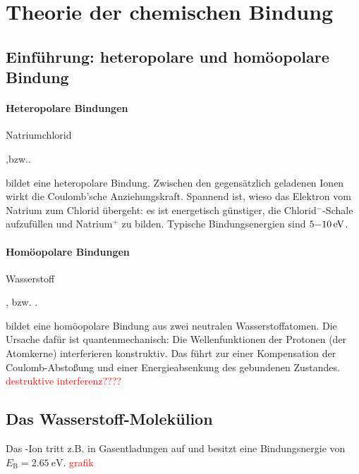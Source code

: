 \clearpage
\section{Theorie der chemischen Bindung}
\subsection{Einführung: heteropolare und homöopolare Bindung}
    \paragraph{Heteropolare Bindungen}
    Natriumchlorid
    \begin{center}
        ,\quad bzw.\quad {}.
    \end{center}
    bildet eine heteropolare Bindung.
    Zwischen den gegensätzlich geladenen Ionen wirkt die Coulomb'sche Anziehungskraft.     
    Spannend ist, wieso das Elektron vom Natrium zum Chlorid übergeht: 
    es ist energetisch günstiger, die Chlorid${}^-$-Schale aufzufüllen und Natrium${}^+$ zu bilden. 
    Typische Bindungsenergien sind $\SI[parse-numbers=false]{5\text-10}{\electronvolt}$.

    \paragraph{Homöopolare Bindungen}
    Wasserstoff
    \begin{center}
        , \quad bzw. \quad{}.
    \end{center}
    bildet eine homöopolare Bindung aus zwei neutralen Wasserstoffatomen.
    Die Ursache dafür ist quantenmechanisch: 
    Die Wellenfunktionen der Protonen (der Atomkerne) interferieren konstruktiv.
    Das führt zur einer Kompensation der Coulomb-Abstoßung und einer Energieabsenkung des gebundenen Zustandes.
    \textcolor{red}{destruktive interferenz????}

\subsection{Das Wasserstoff-Molekülion }
    Das -Ion tritt z.B. in Gasentladungen auf und besitzt eine Bindungsnergie von $E_\text{B}= \SI{2,65}{\electronvolt}$.
    \textcolor{red}{grafik}\\[1ex]
    \\


